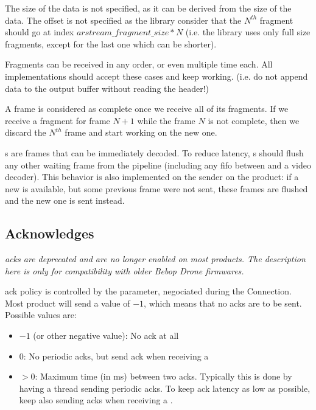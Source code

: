 The size of the data is not specified, as it can be derived from the size of the  data. The offset is not specified as the library consider that the $N^{th}$ fragment should go at index $arstream\_fragment\_size*N$ (i.e. the library uses only full size fragments, except for the last one which can be shorter).

Fragments can be received in any order, or even multiple time each. All implementations should accept these cases and keep working. (i.e. do not append data to the output buffer without reading the header!)

A frame is considered as complete once we receive all of its fragments. If we receive a fragment for frame $N+1$ while the frame $N$ is not complete, then we discard the $N^{th}$ frame and start working on the new one.

s are frames that can be immediately decoded. To reduce latency, s should flush any other waiting frame from the pipeline (including any fifo between  and a video decoder). This behavior is also implemented on the  sender on the product: if a new  is available, but some previous frame were not sent, these frames are flushed and the new one is sent instead.

\subsection{Acknowledges}

\emph{ acks are deprecated and are no longer enabled on most products. The description here is only for compatibility with older Bebop Drone firmwares.}

 ack policy is controlled by the  parameter, negociated during the  Connection. Most product will send a value of $-1$, which means that no acks are to be sent.
Possible values are:
\begin{itemize}
\item{$-1$ (or other negative value): No ack at all}
\item{$0$: No periodic acks, but send ack when receiving a }
\item{$>0$: Maximum time (in ms) between two acks. Typically this is done by having a thread sending periodic acks. To keep ack latency as low as possible, keep also sending acks when receiving a .}
\end{itemize}

